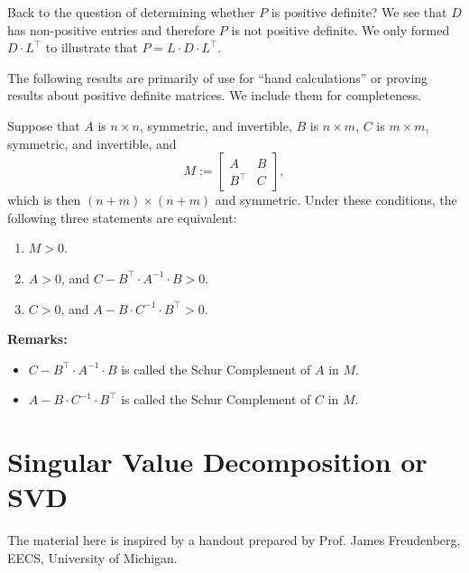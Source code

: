 Back to the question of determining whether $P$ is positive definite? We see that $D$ has non-positive entries and therefore $P$ is not positive definite. We only formed $D \cdot L^\top$ to illustrate that $P=L \cdot D \cdot L^\top$. \Qed

\vspace*{.2cm}

The following results are primarily of use for ``hand calculations'' or proving results about positive definite matrices. We include them for completeness.

\begin{tcolorbox}[title=\textbf{Schur Complement Theorem: A way to Decompose the Test for Being Positive Definite}]
Suppose that $A$ is $n \times n$, symmetric, and invertible, $B$ is $n \times m$,
	$C$ is $m \times m$, symmetric, and invertible, and
	$$M := \left[ \begin{array}{cc} A & B \\	B^\top & C \end{array} \right],$$
	which is then $(n+m) \times (n + m)$ and symmetric. Under these conditions, the following three statements are equivalent:
	\begin{enumerate}
	\renewcommand{\labelenumi}{(\alph{enumi})}
\setlength{\itemsep}{.2cm}
		\item $M>0$.
		\item $A>0$, and $C-B^\top \cdot A^{-1} \cdot B > 0$.
		\item $C>0$, and $A - B \cdot C ^{-1} \cdot B^\top >0$.
	\end{enumerate}

\textbf{Remarks:}	
	\begin{itemize}
	    \item  $C-B^\top \cdot A^{-1} \cdot B$ is called the Schur Complement of $A$ in $M$.

\item  $A-B \cdot C^{-1} \cdot B^\top$ is called the Schur Complement of $C$ in $M$.

	\end{itemize}

\end{tcolorbox}

	

\section{Singular Value Decomposition or SVD}
The material here is inspired by a handout prepared by Prof. James Freudenberg, EECS, University of Michigan.

